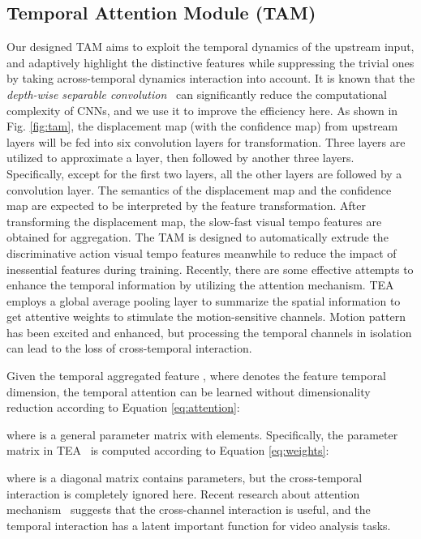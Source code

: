 \documentclass[journal]{IEEEtran}
\begin{document}
\subsection{Temporal Attention Module (TAM)}
Our designed TAM aims to exploit the temporal dynamics of the upstream input, and adaptively highlight the distinctive features while suppressing the trivial ones by taking across-temporal dynamics interaction into account. It is known that the \textit{depth-wise separable convolution}~\cite{t2020Zhang} can significantly reduce the computational complexity of CNNs, and we use it to improve the efficiency here. As shown in Fig. \ref{fig:tam}, the displacement map (with the confidence map) from upstream layers will be fed into six convolution layers for transformation. Three  layers are utilized to approximate a  layer, then followed by another three  layers. Specifically, except for the first two layers, all the other layers are followed by a  convolution layer. The semantics of the displacement map and the confidence map are expected to be interpreted by the feature transformation.
After transforming the displacement map, the slow-fast visual tempo features are obtained for aggregation. The TAM is designed to automatically extrude the discriminative action visual tempo features meanwhile to reduce the impact of inessential features during training. Recently, there are some effective attempts to enhance the temporal information by utilizing the attention mechanism. TEA~\cite{li2020tea} employs a global average pooling layer to summarize the spatial information to get attentive weights to stimulate the motion-sensitive channels. Motion pattern has been excited and enhanced, but processing the temporal channels in isolation can lead to the loss of cross-temporal interaction.

Given the temporal aggregated feature , where  denotes the feature temporal dimension, the temporal attention can be learned without dimensionality reduction according to Equation \ref{eq:attention}:

where  is a general parameter matrix with  elements. Specifically, the parameter matrix in TEA~\cite{li2020tea} is computed according to Equation \ref{eq:weights}:

where  is a diagonal matrix contains  parameters, but the cross-temporal interaction is completely ignored here. Recent research about attention mechanism~\cite{Wang_2020_CVPR_eca} suggests that the cross-channel interaction is useful, and the temporal interaction has a latent important function for video analysis tasks.
\end{document}
